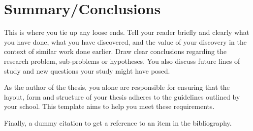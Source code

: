 \documentclass[english, 12pt, a4paper, elec, utf8, a-2b, online]{aaltothesis}
\begin{document}
\clearpage

\section{Summary/Conclusions}
\label{sec:summary}

This is where you tie up any loose ends. Tell your reader briefly and clearly 
what you have done, what you have discovered, and the value of your discovery 
in the context of similar work done earlier. Draw clear conclusions regarding 
the research problem, sub-problems or hypotheses. You also discuss future lines 
of study and new questions your study might have posed.

As the author of the thesis, you alone are responsible for ensuring that the 
layout, form and structure of your thesis adheres to the guidelines outlined by 
your school. This template aims to help you meet these requirements.

Finally, a dummy citation \cite{Dyson} to get a reference to an item in the bibliography.



\clearpage


\nocite{*} %
\printbibliography[heading=bibintoc] %



%
%
%
%
%
\end{document}

